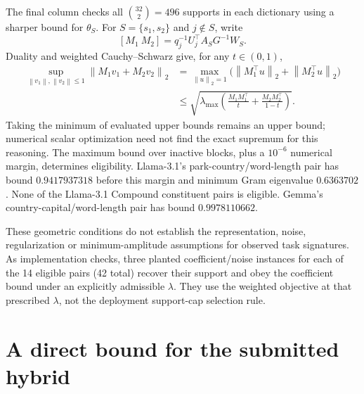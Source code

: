 \documentclass[11pt]{article}
\newcommand{\norm}[1]{\left\lVert#1\right\rVert}
\begin{document}
The final column checks all $\binom{32}{2}=496$ supports in each dictionary
using a sharper bound for $\theta_S$. For $S=\{s_1,s_2\}$ and $j\notin S$,
write
\[
 [M_1\ M_2]=q_j^{-1}U_j^\top A_SG^{-1}W_S.
\]
Duality and weighted Cauchy--Schwarz give, for any $t\in(0,1)$,
\begin{align*}
 \sup_{\norm{v_1},\norm{v_2}\leq1}\norm{M_1v_1+M_2v_2}_2
 &=\max_{\norm{u}_2=1}\big(\norm{M_1^\top u}_2+\norm{M_2^\top u}_2\big)\\
 &\leq\sqrt{\lambda_{\max}\!\left(
          \frac{M_1M_1^\top}{t}+\frac{M_2M_2^\top}{1-t}\right)}.
\end{align*}
Taking the minimum of evaluated upper bounds remains an upper bound; numerical
scalar optimization need not find the exact supremum for this reasoning.
The maximum bound over inactive blocks, plus a $10^{-6}$ numerical margin,
determines eligibility. Llama-3.1's park-country/word-length pair has bound
$0.9417937318$ before this margin and minimum Gram eigenvalue $0.6363702$.
None of the Llama-3.1 Compound constituent pairs is eligible. Gemma's
country-capital/word-length pair has bound $0.9978110662$.

These geometric conditions do not establish the representation, noise,
regularization or minimum-amplitude assumptions for observed task signatures.
As implementation checks, three planted coefficient/noise instances for each of
the 14 eligible pairs (42 total) recover their support and obey the coefficient
bound under an explicitly admissible $\lambda$. They use the weighted objective
at that prescribed $\lambda$, not the deployment support-cap selection rule.

\section{A direct bound for the submitted hybrid}
\end{document}
